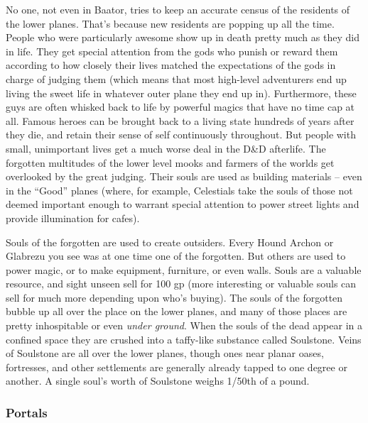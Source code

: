 No one, not even in Baator, tries to keep an accurate census of the residents of the lower planes. That's because new residents are popping up all the time. People who were particularly awesome show up in death pretty much as they did in life. They get special attention from the gods who punish or reward them according to how closely their lives matched the expectations of the gods in charge of judging them (which means that most high-level adventurers end up living the sweet life in whatever outer plane they end up in). Furthermore, these guys are often whisked back to life by powerful magics that have no time cap at all. Famous heroes can be brought back to a living state hundreds of years after they die, and retain their sense of self continuously throughout. But people with small, unimportant lives get a much worse deal in the D\&D afterlife. The forgotten multitudes of the lower level mooks and farmers of the worlds get overlooked by the great judging. Their souls are used as building materials -- even in the ``Good'' planes (where, for example, Celestials take the souls of those not deemed important enough to warrant special attention to power street lights and provide illumination for cafes).

Souls of the forgotten are used to create outsiders. Every Hound Archon or Glabrezu you see was at one time one of the forgotten. But others are used to power magic, or to make equipment, furniture, or even walls. Souls are a valuable resource, and sight unseen sell for 100 gp (more interesting or valuable souls can sell for much more depending upon who's buying). The souls of the forgotten bubble up all over the place on the lower planes, and many of those places are pretty inhospitable or even \textit{under ground}. When the souls of the dead appear in a confined space they are crushed into a taffy-like substance called Soulstone. Veins of Soulstone are all over the lower planes, though ones near planar oases, fortresses, and other settlements are generally already tapped to one degree or another. A single soul's worth of Soulstone weighs 1/50th of a pound.

\subsubsection{Portals}

